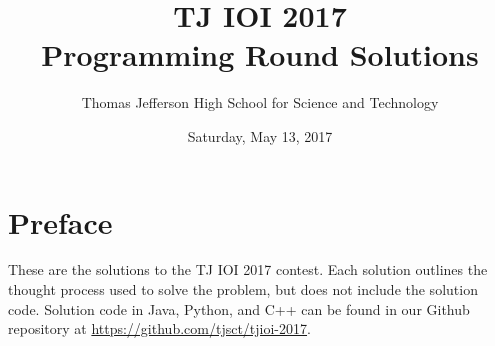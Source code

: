 \documentclass{article}
\begin{document}
\title{
    {\Huge TJ IOI 2017}\\
    {\huge Programming Round Solutions}
}

\author{
	\large
	Thomas Jefferson High School for Science and Technology
}
\date{\large Saturday, May 13, 2017}


\begin{titlepage}
    \maketitle
\end{titlepage}



\tableofcontents
\newpage

\section*{Preface}

These are the solutions to the TJ IOI 2017 contest.  Each solution outlines the thought process used to solve the problem, but does not include the solution code.  Solution code in Java, Python, and C++ can be found in our Github repository at \url{https://github.com/tjsct/tjioi-2017}.

\newpage






\newpage




\newpage




\newpage




\newpage




\newpage




\newpage




\newpage




\newpage




\newpage


  
\end{document}
